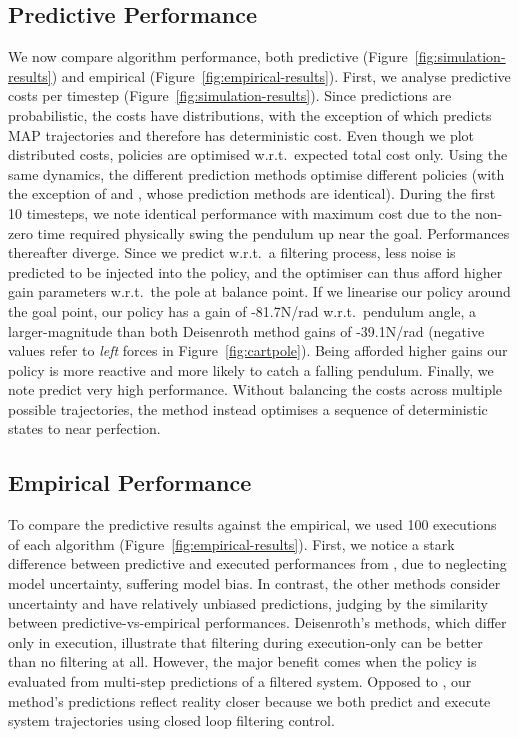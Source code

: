 \documentclass{article}
\begin{document}
\subsection{Predictive Performance}
We now compare algorithm performance, both predictive (Figure~\ref{fig:simulation-results})
and %
empirical %
(Figure~\ref{fig:empirical-results}).
%
First, we analyse predictive costs per timestep (Figure~\ref{fig:simulation-results}).
Since predictions are probabilistic,
the costs have distributions, %
with the exception of \citet{dallaire2009} which predicts MAP trajectories
and therefore has deterministic cost.
Even though we plot distributed costs,
policies are optimised w.r.t.\ expected total cost only.
%
Using the same dynamics,
the different prediction methods optimise different policies
(with the exception of \citet{pilco} and \citet{deisenroth2013},
whose prediction methods are identical).
During the first 10 timesteps, we note %
identical performance with maximum cost
due to the non-zero time required physically swing the pendulum up
near the goal.
Performances thereafter diverge.
Since we predict w.r.t.\ a filtering process,
less noise is predicted to be injected into the policy,
and the optimiser can thus afford higher gain parameters w.r.t.\ the pole at balance point.
If we linearise our policy around the goal point,
our policy has a gain of -81.7N/rad w.r.t.\ pendulum angle,
a larger-magnitude than both Deisenroth method gains of -39.1N/rad
(negative values refer to \textit{left} forces in Figure~\ref{fig:cartpole}).
Being afforded higher gains
our policy is more reactive and more likely to catch a falling pendulum.
Finally,
we note \citet{dallaire2009} predict very high performance.
Without balancing the costs across multiple possible trajectories,
the method instead optimises a sequence of deterministic states to near perfection.

\subsection{Empirical Performance}
To compare the predictive results against the empirical,
we used 100 executions of each algorithm (Figure~\ref{fig:empirical-results}).
First, we notice a stark difference between predictive and executed performances from \citet{dallaire2009},
due to neglecting model uncertainty, suffering model bias.
In contrast, the other methods consider uncertainty and have relatively unbiased predictions,
judging by the similarity between predictive-vs-empirical performances.
Deisenroth's methods, which differ only in execution,
illustrate that filtering during execution-only can be better than no filtering at all.
However, the major benefit comes when
the policy is evaluated from multi-step predictions of a filtered system.
Opposed to \citet{deisenroth2013},
our method's predictions reflect reality closer
because we both predict and execute system trajectories
using closed loop filtering control. %
\end{document}
